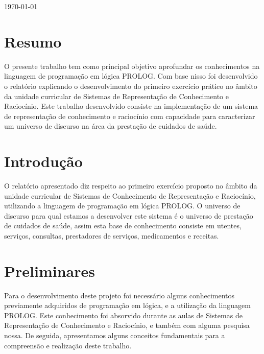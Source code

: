 \documentclass[25pt]{article}
\begin{document}
\begin{titlepage}
{\large \today}\\[2cm]




\vfill %

\end{titlepage}
\section{Resumo}
 O presente trabalho tem como principal objetivo aprofundar os conhecimentos na linguagem de programação em lógica PROLOG.\newline
 Com base nisso foi desenvolvido o relatório explicando o desenvolvimento do primeiro exercício prático no âmbito da unidade
 curricular de Sistemas de Representação de Conhecimento e Raciocínio.\newline
 Este trabalho desenvolvido consiste na implementação de um sistema de representação de conhecimento e raciocínio com capacidade
 para caracterizar um universo de discurso na área da prestação de cuidados de saúde.\newline



\newpage
\tableofcontents
\newpage
\section{Introdução}
O relatório apresentado diz respeito ao primeiro exercício proposto no âmbito da unidade curricular de Sistemas de
Conhecimento de Representação e Raciocínio, utilizando a linguagem de programação em lógica PROLOG. O universo de discurso
para qual estamos a desenvolver este sistema é o universo de prestação de cuidados de saúde, assim esta base de conhecimento consiste
em utentes, serviços, consultas, prestadores de serviços, medicamentos e receitas.
\newpage
\section{Preliminares}
Para o desenvolvimento deste projeto foi necessário alguns conhecimentos previamente adquiridos de programação em lógica, e a
utilização da linguagem PROLOG. Este conhecimento foi absorvido durante as aulas de Sistemas de Representação de Conhecimento e Raciocínio,
e também com alguma pesquisa nossa. De seguida, apresentamos alguns conceitos fundamentais para a compreensão e realização deste trabalho.
\end{document}
